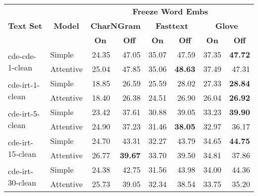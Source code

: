 \begin{tabular}{| l | l | r | r | r | r | r | r |}
    \hline

    \multicolumn{1}{|c|}{\multirow{3}{*}{\textbf{Text Set}}} &
    \multicolumn{1}{|c|}{\multirow{3}{*}{\textbf{Model}}} &
    \multicolumn{6}{|c|}{\textbf{Freeze Word Embs}} \\

    &
    &
    \multicolumn{2}{|c|}{\textbf{CharNGram}} &
    \multicolumn{2}{|c|}{\textbf{Fasttext}} &
    \multicolumn{2}{|c|}{\textbf{Glove}} \\

    &
    &
    \multicolumn{1}{|c|}{\textbf{On}} &
    \multicolumn{1}{|c|}{\textbf{Off}} &
    \multicolumn{1}{|c|}{\textbf{On}} &
    \multicolumn{1}{|c|}{\textbf{Off}} &
    \multicolumn{1}{|c|}{\textbf{On}} &
    \multicolumn{1}{|c|}{\textbf{Off}} \\

    \hline \hline

    \multirow{2}{*}{cde-cde-1-clean}
    & Simple    & 24.35 & 47.05 & 35.07 & 47.59 & 37.35 & \textbf{47.72} \\
    & Attentive & 25.04 & 47.85 & 35.06 & \textbf{48.63} & 37.49 & 47.31 \\ \hline

    \multirow{2}{*}{cde-irt-1-clean}
    & Simple    & 18.85 & 26.59 & 25.59 & 28.02 & 27.33 & \textbf{28.84} \\
    & Attentive & 18.40 & 26.38 & 24.51 & 26.90 & 26.04 & \textbf{26.92} \\ \hline

    \multirow{2}{*}{cde-irt-5-clean}
    & Simple    & 23.42 & 37.61 & 30.88 & 39.05 & 33.23 & \textbf{39.90} \\
    & Attentive & 24.90 & 37.23 & 31.46 & \textbf{38.05} & 32.97 & 36.17 \\ \hline

    \multirow{2}{*}{cde-irt-15-clean}
    & Simple    & 24.70 & 43.31 & 32.27 & 43.79 & 34.65 & \textbf{44.75} \\
    & Attentive & 26.77 & \textbf{39.67} & 33.70 & 39.50 & 34.81 & 37.86 \\ \hline

    \multirow{2}{*}{cde-irt-30-clean}
    & Simple    & 24.38 & 42.75 & 31.56 & 43.98 & 34.00 & 44.36 \\
    & Attentive & 25.73 & 39.05 & 32.34 & 38.54 & 33.75 & 35.20 \\ \hline \hline


\end{tabular}
